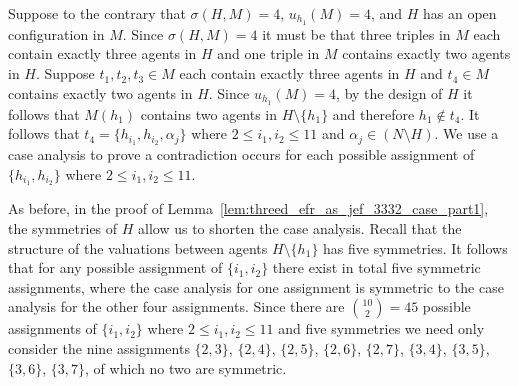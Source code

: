Suppose to the contrary that $\sigma(H, M) = 4$, $u_{h_1}(M) = 4$, and $H$ has an open configuration in $M$. Since $\sigma(H, M) = 4$ it must be that three triples in $M$ each contain exactly three agents in $H$ and one triple in $M$ contains exactly two agents in $H$. Suppose $t_1, t_2, t_3 \in M$ each contain exactly three agents in $H$ and $t_4 \in M$ contains exactly two agents in $H$. Since $u_{h_1}(M) = 4$, by the design of $H$ it follows that $M(h_1)$ contains two agents in $H \setminus \{ h_1 \}$ and therefore $h_1 \notin t_4$. It follows that $t_4 = \{ h_{i_1}, h_{i_2}, \alpha_{j} \}$ where $2 \leq i_1, i_2 \leq 11$ and $\alpha_{j} \in (N \setminus H)$.  We use a case analysis to prove a contradiction occurs for each possible assignment of $\{ h_{i_1}, h_{i_2} \}$ where $2\leq i_1, i_2 \leq 11$.

As before, in the proof of Lemma~\ref{lem:threed_efr_as_jef_3332_case_part1}, the symmetries of $H$ allow us to shorten the case analysis. Recall that the structure of the valuations between agents $H \setminus \{ h_1 \}$ has five symmetries. It follows that for any possible assignment of $\{ {i_1}, {i_2} \}$ there exist in total five symmetric assignments, where the case analysis for one assignment is symmetric to the case analysis for the other four assignments. Since there are $\binom{10}{2}=45$ possible assignments of $\{ {i_1}, {i_2} \}$ where $2\leq i_1, i_2 \leq 11$ and five symmetries we need only consider the nine assignments $\{ 2, 3 \}$, $\{ 2, 4 \}$, $\{ 2, 5 \}$, $\{ 2, 6 \}$, $\{ 2, 7 \}$, $\{ 3, 4 \}$, $\{ 3, 5 \}$, $\{ 3, 6 \}$, $\{ 3, 7 \}$, of which no two are symmetric.

